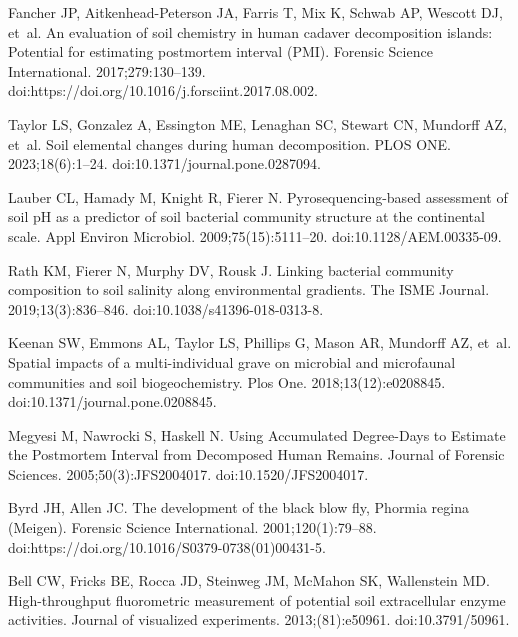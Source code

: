 \documentclass[
  10pt,
  letterpaper,
]{article}
\begin{document}
\begin{thebibliography}{10}
  Fancher JP, Aitkenhead-Peterson JA, Farris T, Mix K, Schwab AP, Wescott DJ,
    et~al.
  \newblock An evaluation of soil chemistry in human cadaver decomposition
    islands: {Potential} for estimating postmortem interval ({PMI}).
  \newblock Forensic Science International. 2017;279:130--139.
  \newblock doi:{https://doi.org/10.1016/j.forsciint.2017.08.002}.
  
  Taylor LS, Gonzalez A, Essington ME, Lenaghan SC, Stewart CN, Mundorff AZ,
    et~al.
  \newblock Soil elemental changes during human decomposition.
  \newblock PLOS ONE. 2023;18(6):1--24.
  \newblock doi:{10.1371/journal.pone.0287094}.
  
  Lauber CL, Hamady M, Knight R, Fierer N.
  \newblock Pyrosequencing-based assessment of soil {pH} as a predictor of soil
    bacterial community structure at the continental scale.
  \newblock Appl Environ Microbiol. 2009;75(15):5111--20.
  \newblock doi:{10.1128/AEM.00335-09}.
  
  Rath KM, Fierer N, Murphy DV, Rousk J.
  \newblock Linking bacterial community composition to soil salinity along
    environmental gradients.
  \newblock The ISME Journal. 2019;13(3):836--846.
  \newblock doi:{10.1038/s41396-018-0313-8}.
  
  Keenan SW, Emmons AL, Taylor LS, Phillips G, Mason AR, Mundorff AZ, et~al.
  \newblock Spatial impacts of a multi-individual grave on microbial and
    microfaunal communities and soil biogeochemistry.
  \newblock Plos One. 2018;13(12):e0208845.
  \newblock doi:{10.1371/journal.pone.0208845}.
  
  Megyesi M, Nawrocki S, Haskell N.
  \newblock Using {Accumulated} {Degree}-{Days} to {Estimate} the {Postmortem}
    {Interval} from {Decomposed} {Human} {Remains}.
  \newblock Journal of Forensic Sciences. 2005;50(3):JFS2004017.
  \newblock doi:{10.1520/JFS2004017}.
  
  Byrd JH, Allen JC.
  \newblock The development of the black blow fly, {Phormia} regina ({Meigen}).
  \newblock Forensic Science International. 2001;120(1):79--88.
  \newblock doi:{https://doi.org/10.1016/S0379-0738(01)00431-5}.
  
  Bell CW, Fricks BE, Rocca JD, Steinweg JM, McMahon SK, Wallenstein MD.
  \newblock High-throughput fluorometric measurement of potential soil
    extracellular enzyme activities.
  \newblock Journal of visualized experiments. 2013;(81):e50961.
  \newblock doi:{10.3791/50961}.
  

\end{thebibliography}
\end{document}
